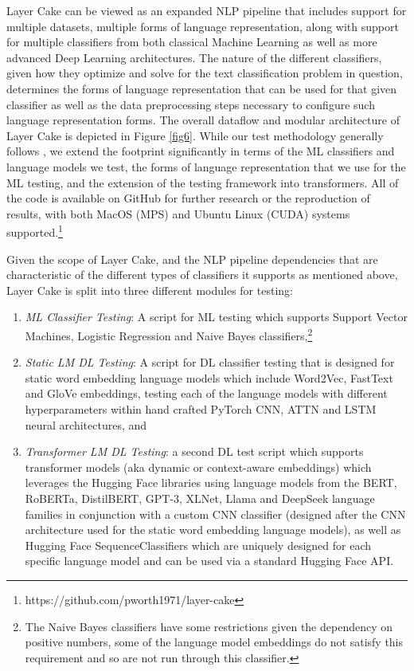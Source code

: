 \documentclass[final]{clv2025}
\begin{document}
Layer Cake can be viewed as an expanded NLP pipeline that includes support for multiple datasets, multiple forms of language representation, along with support for multiple classifiers from both classical Machine Learning as well as more advanced Deep Learning architectures. The nature of the different classifiers, given how they optimize and solve for the text classification problem in question, determines the forms of language representation that can be used for that given classifier as well as the data preprocessing steps necessary to configure such language representation forms. The overall dataflow and modular architecture of Layer Cake is depicted in Figure \ref{fig6}. While our test methodology generally follows \cite{moreo2021}, we extend the footprint significantly in terms of the ML classifiers and language models we test, the forms of language representation that we use for the ML testing, and the extension of the testing framework into transformers. All of the code is available on GitHub for further research or the reproduction of results, with both MacOS (MPS) and Ubuntu Linux (CUDA) systems supported.\footnote{https://github.com/pworth1971/layer-cake}

Given the scope of Layer Cake, and the NLP pipeline dependencies that are characteristic of the different types of classifiers it supports as mentioned above, Layer Cake is split into three different modules for testing:
\begin{enumerate}
    \item \textit{ML Classifier Testing}: A script for ML testing which supports Support Vector Machines, Logistic Regression and Naive Bayes classifiers,\footnote{The Naive Bayes classifiers have some restrictions given the dependency on positive numbers, some of the language model embeddings do not satisfy this requirement and so are not run through this classifier.}
    \item \textit{Static LM DL Testing}: A script for DL classifier testing that is designed for static word embedding language models which include Word2Vec, FastText and GloVe embeddings, testing each of the language models with different hyperparameters within hand crafted PyTorch CNN, ATTN and LSTM neural architectures, and
    \item \textit{Transformer LM DL Testing}: a second DL test script which supports transformer models (aka dynamic or context-aware embeddings) which leverages the Hugging Face libraries using language models from the BERT, RoBERTa, DistilBERT, GPT-3, XLNet, Llama and DeepSeek language families in conjunction with a custom CNN classifier (designed after the CNN architecture used for the static word embedding language models), as well as Hugging Face SequenceClassifiers which are uniquely designed for each specific language model and can be used via a standard Hugging Face API.
\end{enumerate}
\end{document}
